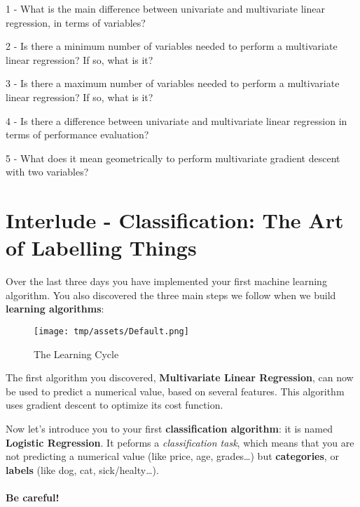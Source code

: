 \documentclass[]{article}
\let\oldparagraph\paragraph
\renewcommand{\paragraph}[1]{\oldparagraph{#1}\mbox{}}
\begin{document}
1 - What is the main difference between univariate and multivariate
linear regression, in terms of variables?

2 - Is there a minimum number of variables needed to perform a
multivariate linear regression? If so, what is it?

3 - Is there a maximum number of variables needed to perform a
multivariate linear regression? If so, what is it?

4 - Is there a difference between univariate and multivariate linear
regression in terms of performance evaluation?

5 - What does it mean geometrically to perform multivariate gradient
descent with two variables?

\clearpage

\hypertarget{interlude---classification-the-art-of-labelling-things-1}{%
\section{Interlude - Classification: The Art of Labelling
Things}\label{interlude---classification-the-art-of-labelling-things-1}}

Over the last three days you have implemented your first machine
learning algorithm. You also discovered the three main steps we follow
when we build \textbf{learning algorithms}:

\begin{figure}
\centering
\texttt{[image: tmp/assets/Default.png]}
\caption{The Learning Cycle}
\end{figure}

The first algorithm you discovered, \textbf{Multivariate Linear
Regression}, can now be used to predict a numerical value, based on
several features. This algorithm uses gradient descent to optimize its
cost function.

Now let's introduce you to your first \textbf{classification algorithm}:
it is named \textbf{Logistic Regression}. It peforms a
\emph{classification task}, which means that you are not predicting a
numerical value (like price, age, grades\ldots{}) but
\textbf{categories}, or \textbf{labels} (like dog, cat,
sick/healty\ldots{}).

\hypertarget{be-careful}{%
\paragraph{\texorpdfstring{\textbf{Be
careful!}}{Be careful!}}\label{be-careful}}
\end{document}
